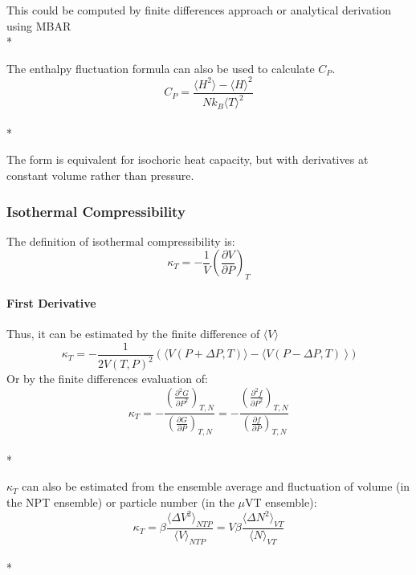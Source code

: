 \documentclass[9pt,bestpractices]{livecoms}
\begin{document}
This could be computed by finite differences approach or analytical derivation using MBAR\\*

The enthalpy fluctuation formula can also be used to calculate $C_P$\cite{horn}.
\begin{equation}C_P = \frac{\langle H^2 \rangle - \langle H \rangle^2}{N k_B \langle T \rangle^2}\end{equation}\\*

The form is equivalent for isochoric heat capacity, but with derivatives at constant volume rather than pressure.


\subsubsection{Isothermal Compressibility}
The definition of isothermal compressibility is:
\begin{equation}\kappa_T = -\frac{1}{V} \left(\frac{\partial V}{\partial P}\right)_T \end{equation}
\paragraph{First Derivative}
Thus, it can be estimated by the finite difference of $\langle V \rangle$
\begin{equation}\kappa_T = -\frac{1}{2V(T,P)^2} \left(\langle V(P+\Delta P,T)\rangle - \langle V(P-\Delta P,T)\right\rangle) \end{equation}
Or by the finite differences evaluation of:
\begin{equation}\kappa_T = -\frac{\left(\frac{\partial^2 G}{\partial P^2}\right)_{T, N}}{\left(\frac{\partial G}{\partial P}\right)_{T, N}} = -\frac{\left(\frac{\partial^2 f}{\partial P^2}\right)_{T, N}}{\left(\frac{\partial f}{\partial P}\right)_{T, N}}\end{equation} \\*

$\kappa_T$ can also be estimated from the ensemble average and fluctuation of volume (in the NPT ensemble) or particle number (in the $\mu$VT ensemble)\cite{comp}:
\begin{equation}\kappa_T = \beta \frac{\langle \Delta V^2 \rangle_{NTP}}{\langle V \rangle_{NTP}} = V \beta \frac{\langle \Delta N^2 \rangle_{VT}}{\langle N \rangle_{VT}}\end{equation}\\*
\end{document}
